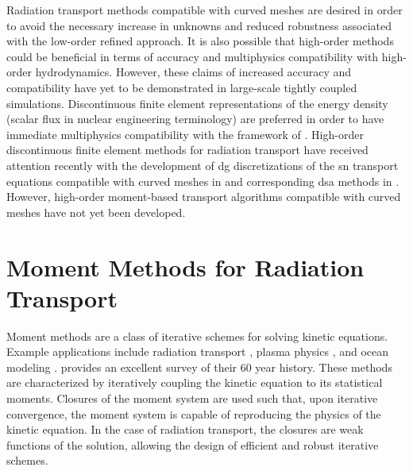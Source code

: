 \documentclass[../doc.tex]{subfiles}
\begin{document}
Radiation transport methods compatible with curved meshes are desired in order to avoid the necessary increase in unknowns and reduced robustness associated with the low-order refined approach. It is also possible that high-order methods could be beneficial in terms of accuracy and multiphysics compatibility with high-order hydrodynamics. However, these claims of increased accuracy and compatibility have yet to be demonstrated in large-scale tightly coupled simulations. Discontinuous finite element representations of the energy density (scalar flux in nuclear engineering terminology) are preferred in order to have immediate multiphysics compatibility with the framework of \cite{blast}. High-order discontinuous finite element methods for radiation transport have received attention recently with the development of \gls{dg} discretizations of the \gls{sn} transport equations compatible with curved meshes in \cite{graph_sweeps,woods_thesis} and corresponding \gls{dsa} methods in \cite{ldrd_dsa,doi:10.1080/00295639.2020.1799603}. 
However, high-order moment-based transport algorithms compatible with curved meshes have not yet been developed. 

\section{Moment Methods for Radiation Transport}
Moment methods are a class of iterative schemes for solving kinetic equations. Example applications include radiation transport \cite{goldin}, plasma physics \cite{MASON1981233}, and ocean modeling \cite{10.1016/j.procs.2015.05.477}. \textcite{CHACON201721} provides an excellent survey of their 60 year history. These methods are characterized by iteratively coupling the kinetic equation to its statistical moments. 
Closures of the moment system are used such that, upon iterative convergence, the moment system is capable of reproducing the physics of the kinetic equation. 
In the case of radiation transport, the closures are weak functions of the solution, allowing the design of efficient and robust iterative schemes. 
\end{document}
